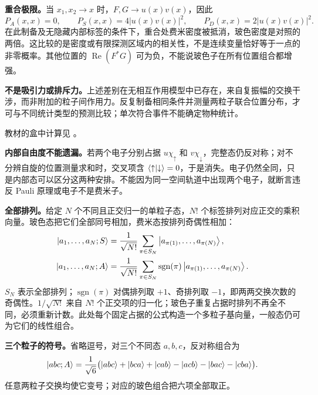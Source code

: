 \textbf{重合极限。}当 $x_1,x_2\to x$ 时，$F,G\to u(x)v(x)$，因此
\begin{equation}
  P_A(x,x)=0,\qquad P_S(x,x)=4|u(x)v(x)|^2,
  \qquad P_D(x,x)=2|u(x)v(x)|^2.
\end{equation}
在此制备及无隐藏内部标签的条件下，重合处费米密度被抵消，玻色密度是对照的两倍。这比较的是密度或有限探测区域内的相关性，不是连续变量恰好等于一点的非零概率。其他位置的 $\operatorname{Re}(F^*G)$ 可为负，不能说玻色子在所有位置组合都增强。

\textbf{不是吸引力或排斥力。}上述差别在无相互作用模型中已存在，来自复振幅的交换干涉，而非附加的粒子间作用力。反复制备相同条件并测量两粒子联合位置分布，才可与不同统计类型的预测比较；单次符合事件不能确定物种统计。

教材的盒中计算见 。

\textbf{内部自由度不能遗漏。}若两个电子分别占据 $u\chi_\uparrow$ 和 $v\chi_\downarrow$，完整态仍反对称；对不分辨自旋的位置测量求和时，交叉项含 $\left\langle \uparrow \middle| \downarrow \right\rangle=0$，于是消失。电子仍然全同，只是内部态可以区分这两种安排。不能因为同一空间轨道中出现两个电子，就断言违反 Pauli 原理或电子不是费米子。

\textbf{全部排列。}给定 $N$ 个不同且正交归一的单粒子态，$N!$ 个标签排列对应正交的乘积向量。玻色态把它们全部同号相加，费米态按排列奇偶性相加：
\begin{align}
  \left|a_1,\ldots,a_N;S\right\rangle
    &=\frac1{\sqrt{N!}}\sum_{\pi\in S_N}
      \left|a_{\pi(1)},\ldots,a_{\pi(N)}\right\rangle,\\
  \left|a_1,\ldots,a_N;A\right\rangle
    &=\frac1{\sqrt{N!}}\sum_{\pi\in S_N}\operatorname{sgn}(\pi)
      \left|a_{\pi(1)},\ldots,a_{\pi(N)}\right\rangle.
\end{align}
$S_N$ 表示全部排列；$\operatorname{sgn}(\pi)$ 对偶排列取 $+1$、奇排列取 $-1$，即两两交换次数的奇偶性。$1/\sqrt{N!}$ 来自 $N!$ 个正交项的归一化；玻色子重复占据时排列不再全不同，必须重新计数。此处每个固定占据的公式构造一个多粒子基向量，一般态仍可为它们的线性组合。

\textbf{三个粒子的符号。}省略逗号，对三个不同态 $a,b,c$，反对称组合为
\begin{equation}
  \left|abc;A\right\rangle=\frac1{\sqrt6}
   \bigl(\left|abc\right\rangle+\left|bca\right\rangle+\left|cab\right\rangle
         -\left|acb\right\rangle-\left|bac\right\rangle-\left|cba\right\rangle\bigr).
\end{equation}
任意两粒子交换均使它变号；对应的玻色组合把六项全部取正。

